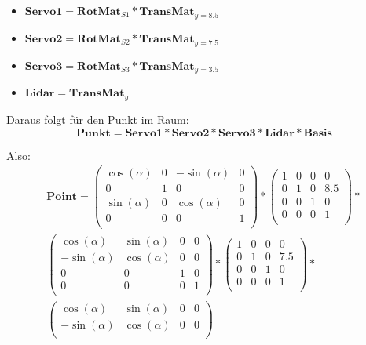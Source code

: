 \documentclass[a4paper,11pt,DIV11]{scrartcl}
\begin{document}
\begin{itemize}
\item $\bm{Servo1} = \bm{RotMat}_{S1} * \bm{TransMat}_{y = 8.5} $
\item $\bm{Servo2} = \bm{RotMat}_{S2} * \bm{TransMat}_{y = 7.5} $
\item $\bm{Servo3} = \bm{RotMat}_{S3} * \bm{TransMat}_{y = 3.5} $
\item $\bm{Lidar}  = \bm{TransMat}_{y} $
\end{itemize}
Daraus folgt für den Punkt im Raum:
\begin{equation}
\bm{Punkt} = \bm{Servo1} * \bm{Servo2} * \bm{Servo3} * \bm{Lidar} * \bm{Basis}
\end{equation}

Also: \\
\begin{align}
\bm{Point} =
\begin{pmatrix}
\cos(\alpha) & 0 &-\sin(\alpha) & 0 \\
0 & 1 & 0 & 0 \\
\sin(\alpha) & 0 & \cos(\alpha) & 0 \\
0 & 0 & 0 & 1 \\
\end{pmatrix} *
\begin{pmatrix}
1 & 0 & 0 & 0 \\
0 & 1 & 0 & 8.5 \\
0 & 0 & 1 & 0 \\
0 & 0 & 0 & 1 \\
\end{pmatrix} 
* \\
\begin{pmatrix}
 \cos(\alpha) & \sin(\alpha) & 0 & 0 \\
-\sin(\alpha) & \cos(\alpha) & 0 & 0 \\
0 & 0 & 1 & 0 \\
0 & 0 & 0 & 1 \\
\end{pmatrix}
*
\begin{pmatrix}
1 & 0 & 0 & 0 \\
0 & 1 & 0 & 7.5 \\
0 & 0 & 1 & 0 \\
0 & 0 & 0 & 1 \\
\end{pmatrix} 
* \\
\begin{pmatrix}
 \cos(\alpha) & \sin(\alpha) & 0 & 0 \\
-\sin(\alpha) & \cos(\alpha) & 0 & 0 \\

\end{pmatrix}
\end{align}
\end{document}
